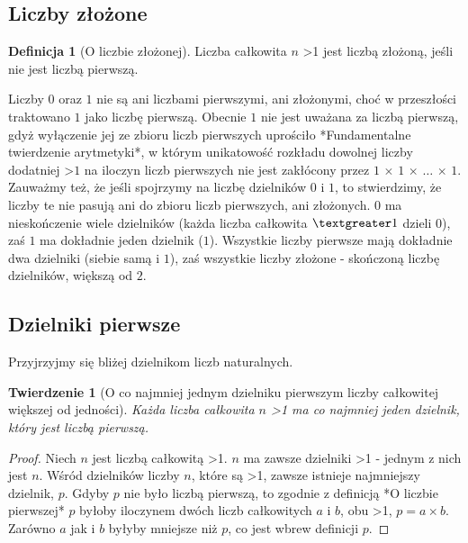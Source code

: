 \documentclass[10pt,onecolumn]{article}
\newtheorem{theorem}{Twierdzenie}
\theoremstyle{definition}
\newtheorem{definition}{Definicja}
\theoremstyle{hypothesis}
\theoremstyle{capability}
\begin{document}
\subsection{Liczby złożone}

\begin{definition} [O liczbie złożonej]
Liczba całkowita $n$ \textgreater 1 jest liczbą złożoną, jeśli nie jest liczbą pierwszą.
\end{definition}

Liczby $0$ oraz $1$ nie są ani liczbami pierwszymi, ani złożonymi, choć w przeszłości traktowano $1$ jako liczbę pierwszą. Obecnie $1$ nie jest uważana za liczbą pierwszą, gdyż wyłączenie jej ze zbioru liczb pierwszych uprościło *Fundamentalne twierdzenie arytmetyki*, w którym unikatowość rozkładu dowolnej liczby dodatniej \textgreater $1$ na iloczyn liczb pierwszych nie jest zakłócony przez $1$ $\times$ $1$ $\times$ $\ldots$ $\times$ $1$. Zauważmy też, że jeśli spojrzymy na liczbę dzielników $0$ i $1$, to stwierdzimy, że liczby te nie pasują ani do zbioru liczb pierwszych, ani złożonych. $0$ ma nieskończenie wiele dzielników (każda liczba całkowita $\textgreater 1$ dzieli $0$), zaś $1$ ma dokładnie jeden dzielnik ($1$). Wszystkie liczby pierwsze mają dokładnie dwa dzielniki (siebie samą i $1$), zaś wszystkie liczby złożone - skończoną liczbę dzielników, większą od $2$.

\subsection{Dzielniki pierwsze}

Przyjrzyjmy się bliżej dzielnikom liczb naturalnych.

\begin{theorem} [O co najmniej jednym dzielniku pierwszym liczby całkowitej większej od jedności]
Każda liczba całkowita $n$ \textgreater 1 ma co najmniej jeden dzielnik, który jest liczbą pierwszą. 
\end{theorem}
 
\begin{proof}
Niech $n$ jest liczbą całkowitą \textgreater 1. $n$ ma zawsze dzielniki \textgreater 1 - jednym z nich jest $n$.  Wśród dzielników liczby $n$, które są \textgreater 1, zawsze istnieje najmniejszy dzielnik, $p$. Gdyby $p$ nie było liczbą pierwszą, to zgodnie z definicją *O liczbie pierwszej* $p$ byłoby iloczynem dwóch liczb całkowitych $a$ i $b$, obu \textgreater 1, $p = a \times b$. Zarówno $a$ jak i $b$ byłyby mniejsze niż $p$, co jest wbrew definicji $p$.
\end{proof}
\end{document}
